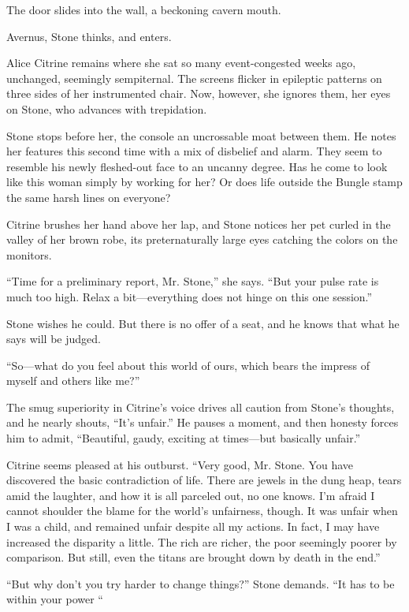 The door slides into the wall, a beckoning cavern mouth.

Avernus, Stone thinks, and enters.

Alice Citrine remains where she sat so many event-congested weeks ago, unchanged, seemingly sempiternal. The screens flicker in epileptic patterns on three sides of her instrumented chair. Now, however, she ignores them, her eyes on Stone, who advances with trepidation.

Stone stops before her, the console an uncrossable moat between them. He notes her features this second time with a mix of disbelief and alarm. They seem to resemble his newly fleshed-out face to an uncanny degree. Has he come to look like this woman simply by working for her? Or does life outside the Bungle stamp the same harsh lines on everyone?

Citrine brushes her hand above her lap, and Stone notices her pet curled in the valley of her brown robe, its preternaturally large eyes catching the colors on the monitors.

``Time for a preliminary report, Mr. Stone,'' she says. ``But your pulse rate is much too high. Relax a bit---everything does not hinge on this one session.''

Stone wishes he could. But there is no offer of a seat, and he knows that what he says will be judged.

``So---what do you feel about this world of ours, which bears the impress of myself and others like me?''

The smug superiority in Citrine's voice drives all caution from Stone's thoughts, and he nearly shouts, ``It's unfair.'' He pauses a moment, and then honesty forces him to admit, ``Beautiful, gaudy, exciting at times---but basically unfair.''

Citrine seems pleased at his outburst. ``Very good, Mr. Stone. You have discovered the basic contradiction of life. There are jewels in the dung heap, tears amid the laughter, and how it is all parceled out, no one knows. I'm afraid I cannot shoulder the blame for the world's unfairness, though. It was unfair when I was a child, and remained unfair despite all my actions. In fact, I may have increased the disparity a little. The rich are richer, the poor seemingly poorer by comparison. But still, even the titans are brought down by death in the end.''

``But why don't you try harder to change things?'' Stone demands. ``It has to be within your power ``

